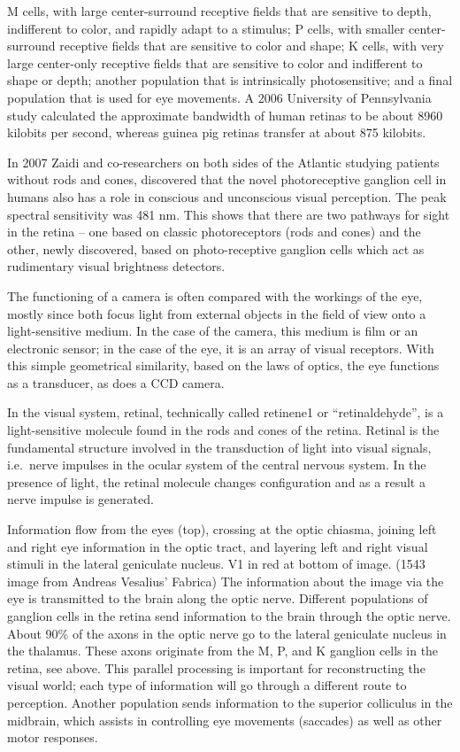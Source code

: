 \documentclass[]{book}
\begin{document}
M cells, with large center-surround receptive fields that are sensitive to depth, indifferent to color, and rapidly adapt to a stimulus;
P cells, with smaller center-surround receptive fields that are sensitive to color and shape;
K cells, with very large center-only receptive fields that are sensitive to color and indifferent to shape or depth;
another population that is intrinsically photosensitive; and
a final population that is used for eye movements.
A 2006 University of Pennsylvania study calculated the approximate bandwidth of human retinas to be about 8960 kilobits per second, whereas guinea pig retinas transfer at about 875 kilobits.

In 2007 Zaidi and co-researchers on both sides of the Atlantic studying patients without rods and cones, discovered that the novel photoreceptive ganglion cell in humans also has a role in conscious and unconscious visual perception. The peak spectral sensitivity was 481 nm. This shows that there are two pathways for sight in the retina -- one based on classic photoreceptors (rods and cones) and the other, newly discovered, based on photo-receptive ganglion cells which act as rudimentary visual brightness detectors.

The functioning of a camera is often compared with the workings of the eye, mostly since both focus light from external objects in the field of view onto a light-sensitive medium. In the case of the camera, this medium is film or an electronic sensor; in the case of the eye, it is an array of visual receptors. With this simple geometrical similarity, based on the laws of optics, the eye functions as a transducer, as does a CCD camera.

In the visual system, retinal, technically called retinene1 or ``retinaldehyde'', is a light-sensitive molecule found in the rods and cones of the retina. Retinal is the fundamental structure involved in the transduction of light into visual signals, i.e.~nerve impulses in the ocular system of the central nervous system. In the presence of light, the retinal molecule changes configuration and as a result a nerve impulse is generated.

Information flow from the eyes (top), crossing at the optic chiasma, joining left and right eye information in the optic tract, and layering left and right visual stimuli in the lateral geniculate nucleus. V1 in red at bottom of image. (1543 image from Andreas Vesalius' Fabrica)
The information about the image via the eye is transmitted to the brain along the optic nerve. Different populations of ganglion cells in the retina send information to the brain through the optic nerve. About 90\% of the axons in the optic nerve go to the lateral geniculate nucleus in the thalamus. These axons originate from the M, P, and K ganglion cells in the retina, see above. This parallel processing is important for reconstructing the visual world; each type of information will go through a different route to perception. Another population sends information to the superior colliculus in the midbrain, which assists in controlling eye movements (saccades) as well as other motor responses.
\end{document}
